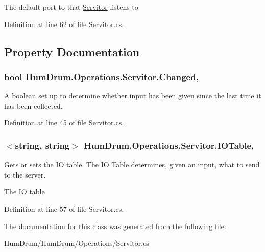 The default port to that \hyperlink{classHumDrum_1_1Operations_1_1Servitor}{Servitor} listens to 



Definition at line 62 of file Servitor.\+cs.



\subsection{Property Documentation}
\subsubsection[{\texorpdfstring{Changed}{Changed}}]{\setlength{\rightskip}{0pt plus 5cm}bool Hum\+Drum.\+Operations.\+Servitor.\+Changed\hspace{0.3cm}{\ttfamily [get]}, {\ttfamily [set]}}\hypertarget{classHumDrum_1_1Operations_1_1Servitor_aacd5394a7844c38e5d4bfd96b00deefe}{}\label{classHumDrum_1_1Operations_1_1Servitor_aacd5394a7844c38e5d4bfd96b00deefe}


A boolean set up to determine whether input has been given since the last time it has been collected. 



Definition at line 45 of file Servitor.\+cs.

\subsubsection[{\texorpdfstring{I\+O\+Table}{IOTable}}]{$<$string, string$>$ Hum\+Drum.\+Operations.\+Servitor.\+I\+O\+Table\hspace{0.3cm}{\ttfamily [get]}, {\ttfamily [set]}}\hypertarget{classHumDrum_1_1Operations_1_1Servitor_a01c71b67a5ca6154fd1938106b17ebf5}{}\label{classHumDrum_1_1Operations_1_1Servitor_a01c71b67a5ca6154fd1938106b17ebf5}


Gets or sets the IO table. The IO Table determines, given an input, what to send to the server. 

The IO table

Definition at line 57 of file Servitor.\+cs.



The documentation for this class was generated from the following file\+:\begin{DoxyCompactItemize}
\item 
Hum\+Drum/\+Hum\+Drum/\+Operations/Servitor.\+cs\end{DoxyCompactItemize}
